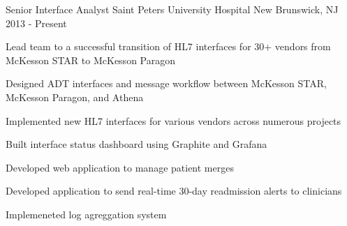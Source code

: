 

\begin{cventries}

  \cventry
  {Senior Interface Analyst} %
  {Saint Peters University Hospital} %
  {New Brunswick, NJ} %
  {2013 - Present} %
  {
    \begin{cvitems} %
      \item {Lead team to a successful transition of HL7 interfaces for 30+ vendors from McKesson STAR to McKesson Paragon}
      \item {Designed ADT interfaces and message workflow between McKesson STAR, McKesson Paragon, and Athena}
      \item {Implemented new HL7 interfaces for various vendors across numerous
          projects}
      \item {Built interface status dashboard using Graphite and Grafana}
      \item {Developed web application to manage patient merges}
      \item {Developed application to send real-time 30-day readmission alerts to clinicians}
      \item {Implemeneted log agreggation system}
    \end{cvitems}
  }


\end{cventries}
